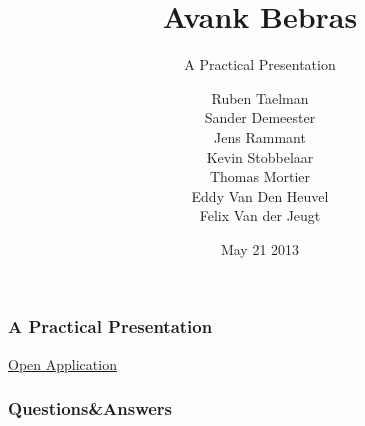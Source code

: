 \documentclass{beamer}
\title{Avank Bebras}
\subtitle{A Practical Presentation}
\author{
    Ruben Taelman \\
    Sander Demeester \\
    Jens Rammant \\
    Kevin Stobbelaar \\
    Thomas Mortier \\
    Eddy Van Den Heuvel \\
    Felix Van der Jeugt
}
\date{May 21 2013}
\begin{document}
    \frame{\titlepage}



    \begin{frame}
        \frametitle{A Practical Presentation}
        \center \href{http://avank.ugent.be}{\Large \guillemotleft Open Application\guillemotright}
    \end{frame}



    \begin{frame}
        \frametitle{Questions\&Answers}
    \end{frame}
\end{document}
